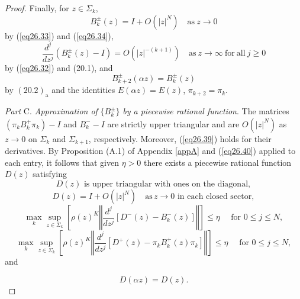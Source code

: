 \documentclass{surv-l}
\theoremstyle{plain}
\theoremstyle{definition}
\numberwithin{equation}{chapter}
\begin{document}
\begin{proof}
Finally, for $z\in\Sigma_{k}$,
\begin{equation}\label{eq26.38}
B_{k}^{\pm}(z)=I+O(|z|^{N})\quad \mathrm{as}\ z\rightarrow 0
\end{equation}
by (\ref{eq26.33}) and (\ref{eq26.34}),
\begin{equation}\label{eq26.39}
\frac{d^{j}}{dz^{j}}(B_{k}^{\pm}(z)-I)=O(|z|^{-(k+1)})\quad \mathrm{as}\  z\rightarrow\infty\ \mathrm{for}\ \mathrm{all}\ j\geq 0
\end{equation}
by (\ref{eq26.32}) and (20.1), and
\begin{equation}\label{eq26.40}
B_{k+2}^{\pm}(\alpha z)=B_{k}^{\pm}(z)
\end{equation}
by $(20.2)_{\mathrm{a}}$ and the identities $E(\alpha z)=E(z)$, $\pi_{k+2}=\pi_{k}$.

\emph{Part} C. \emph{Approximation of} $\{B_{k}^{\pm}\}$ \emph{by a piecewise rational function}. The matrices $(\pi_{k}B_{k}^{+}\pi_{k})-I$ and $B_{k}^{-}-I$ are strictly upper triangular and are $O(|z|^{N})$ as $z\rightarrow 0$ on $\Sigma_{k}$ and $\Sigma_{k+1}$, respectively. Moreover, (\ref{eq26.39}) holds for their derivatives. By Proposition (A.1) of Appendix \ref{appA} and (\ref{eq26.40}) applied to each entry, it follows that given $\eta>0$ there exists a piecewise rational function $D(z)$ satisfying
\begin{equation}\label{eq26.41}
D(z)\text{ is upper triangular with ones on the diagonal},
\end{equation}
\begin{equation}\label{eq26.42}
D(z)=I+O(|z|^{N})\quad \mathrm{as}\, z\rightarrow 0\text{ in each closed sector},
\end{equation}
\begin{equation}\label{eq26.43}
\displaystyle \max_{k}\sup_{z\in\Sigma_{k}}\left[\rho(z)^{K}\left\Vert\frac{d^{j}}{dz^{{j}}}[D^{-}(z)-B_{k}^{-}(z)]\right\Vert\right]\leq\eta\quad \text{ for } 0\leq j\leq N,
\end{equation}
\begin{equation}\label{eq26.44}
\displaystyle \max_{k}\sup_{z\in\Sigma_{k}}\left[\rho(z)^{K}\left\Vert\frac{d^{j}}{dz^{{j}}}[D^{+}(z) -\pi_{k}B_{k}^{+}(z)\pi_{k}]\right\Vert\right]\leq\eta \quad\text{ for } 0\leq j\leq N,
\end{equation}
and

\begin{equation}\label{eq26.45}
D(\alpha z)=D(z).
\end{equation}


\end{proof}
\end{document}
